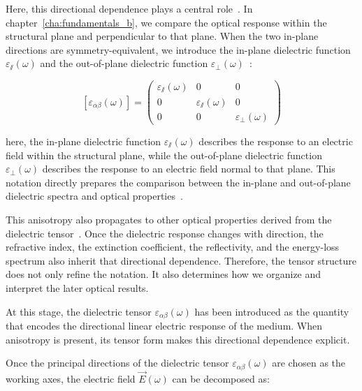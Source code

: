 Here, this directional dependence plays a central role~\cite{slavich2024exploring}.
In chapter~\ref{cha:fundamentals_b}, we compare the optical response within the structural plane and perpendicular to that plane.
When the two in-plane directions are symmetry-equivalent,
we introduce the in-plane dielectric function $\varepsilon_{\varparallel}(\omega)$ and the out-of-plane dielectric function $\varepsilon_{\perp}(\omega)$~\cite{nye1985physical,guo2021complete,matthes2016influence}:

\begin{equation}
    \left[\varepsilon_{\alpha\beta}(\omega)\right] = \begin{pmatrix}
        \varepsilon_{\varparallel}(\omega) & 0 & 0 \\
        0 & \varepsilon_{\varparallel}(\omega) & 0 \\
        0 & 0 & \varepsilon_{\perp}(\omega)
    \end{pmatrix}
\label{inplane_outofplane_dielectric_tensor}
\end{equation}

here, the in-plane dielectric function $\varepsilon_{\varparallel}(\omega)$ describes the response to an electric field within the structural plane,
while the out-of-plane dielectric function $\varepsilon_{\perp}(\omega)$ describes the response to an electric field normal to that plane.
This notation directly prepares the comparison between the in-plane and out-of-plane dielectric spectra and optical properties~\cite{guo2021complete,slavich2024exploring}.

This anisotropy also propagates to other optical properties derived from the dielectric tensor~\cite{sujith2023large,slavich2024exploring}.
Once the dielectric response changes with direction, the refractive index, the extinction coefficient, the reflectivity, and the energy-loss spectrum also inherit that directional dependence.
Therefore, the tensor structure does not only refine the notation.
It also determines how we organize and interpret the later optical results.

At this stage, the dielectric tensor $\varepsilon_{\alpha\beta}(\omega)$ has been introduced as the quantity that encodes the directional linear electric response of the medium.
When anisotropy is present, its tensor form makes this directional dependence explicit.

Once the principal directions of the dielectric tensor $\varepsilon_{\alpha\beta}(\omega)$ are chosen as the working axes, the electric field $\vec{E}(\omega)$ can be decomposed as:


